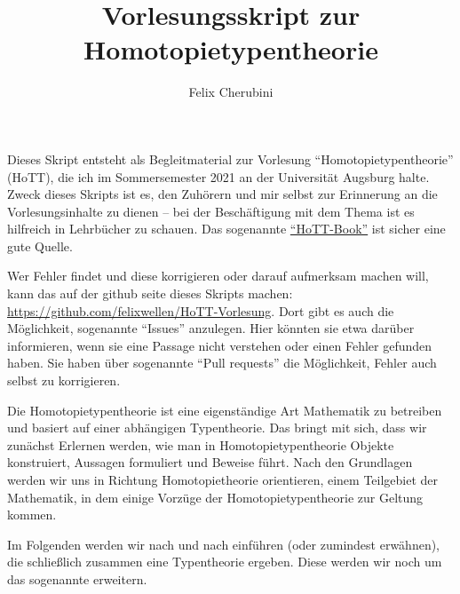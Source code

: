 \documentclass[a4paper,12pt]{article}
\title{Vorlesungsskript zur Homotopietypentheorie}
\author{Felix Cherubini}
\theoremstyle{break}
\theoremstyle{nonumberbreak}
\theoremstyle{nonumberplain}
\begin{document}
\maketitle

\tableofcontents
 \pagebreak
Dieses Skript entsteht als Begleitmaterial zur Vorlesung ``Homotopietypentheorie'' (HoTT), die ich im Sommersemester 2021 an der Universität Augsburg halte.
Zweck dieses Skripts ist es, den Zuhörern und mir selbst zur Erinnerung an die Vorlesungsinhalte zu dienen --
bei der Beschäftigung mit dem Thema ist es hilfreich in Lehrbücher zu schauen.
Das sogenannte \href{https://homotopytypetheory.org/book/}{``HoTT-Book''} ist sicher eine gute Quelle.

Wer Fehler findet und diese korrigieren oder darauf aufmerksam machen will, kann das auf der github seite dieses Skripts machen:
\href{https://github.com/felixwellen/HoTT-Vorlesung}{https://github.com/felixwellen/HoTT-Vorlesung}.
Dort gibt es auch die Möglichkeit, sogenannte ``Issues'' anzulegen.
Hier könnten sie etwa darüber informieren, wenn sie eine Passage nicht verstehen oder einen Fehler gefunden haben.
Sie haben über sogenannte ``Pull requests'' die Möglichkeit, Fehler auch selbst zu korrigieren.

Die Homotopietypentheorie ist eine eigenständige Art Mathematik zu betreiben und basiert auf einer abhängigen Typentheorie.
Das bringt mit sich, dass wir zunächst Erlernen werden, wie man in Homotopietypentheorie Objekte konstruiert, Aussagen formuliert und Beweise führt.
Nach den Grundlagen werden wir uns in Richtung Homotopietheorie orientieren, einem Teilgebiet der Mathematik, in dem einige Vorzüge der Ho\-mo\-to\-pie\-ty\-pen\-theo\-rie zur Geltung kommen.

Im Folgenden werden wir nach und nach  einführen (oder zumindest erwähnen), die schließlich zusammen eine Typentheorie ergeben.
Diese werden wir noch um das sogenannte  erweitern.
\end{document}
